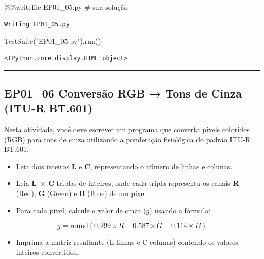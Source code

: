 \documentclass[
  portuguese,
  letterpaper,
  openany,
  oneside,
  12pt,
  a4paper]{book}
\newenvironment{Shaded}{\begin{snugshade}}{\end{snugshade}}
\newcommand{\CommentTok}[1]{\textcolor[rgb]{0.37,0.37,0.37}{#1}}
\newcommand{\NormalTok}[1]{\textcolor[rgb]{0.00,0.23,0.31}{#1}}
\newcommand{\OperatorTok}[1]{\textcolor[rgb]{0.37,0.37,0.37}{#1}}
\newcommand{\StringTok}[1]{\textcolor[rgb]{0.13,0.47,0.30}{#1}}
\providecommand{\tightlist}{%
  \setlength{\itemsep}{0pt}\setlength{\parskip}{0pt}}
\begin{document}
\begin{Shaded}
\begin{Highlighting}[]
\OperatorTok{\%\%}\NormalTok{writefile EP01\_05.py}
\CommentTok{\# sua solução}
\end{Highlighting}
\end{Shaded}

\begin{verbatim}
Writing EP01_05.py
\end{verbatim}

\begin{Shaded}
\begin{Highlighting}[]
\NormalTok{TestSuite(}\StringTok{"EP01\_05.py"}\NormalTok{).run()}
\end{Highlighting}
\end{Shaded}

\begin{verbatim}
<IPython.core.display.HTML object>
\end{verbatim}

\begin{center}\rule{0.5\linewidth}{0.5pt}\end{center}

\subsection{\texorpdfstring{EP01\_06  Conversão
RGB → Tons de Cinza (ITU-R
BT.601)}{EP01\_06  Conversão RGB → Tons de Cinza (ITU-R BT.601)}}\label{ep01_06-conversuxe3o-rgb-tons-de-cinza-itu-r-bt.601}

Nesta atividade, você deve escrever um programa que converta pixels
coloridos (RGB) para tons de cinza utilizando a ponderação fisiológica
do padrão ITU-R BT.601.

\begin{itemize}
\tightlist
\item
  Leia dois inteiros \textbf{L} e \textbf{C}, representando o número de
  linhas e colunas.
\item
  Leia \textbf{L × C} triplas de inteiros, onde cada tripla representa
  os canais \textbf{R} (Red), \textbf{G} (Green) e \textbf{B} (Blue) de
  um pixel.
\item
  Para cada pixel, calcule o valor de cinza (\(g\)) usando a fórmula:
\end{itemize}

\[g = \text{round}(0.299 \times R + 0.587 \times G + 0.114 \times B)\]

\begin{itemize}
\tightlist
\item
  Imprima a matriz resultante (L linhas e C colunas) contendo os valores
  inteiros convertidos.
\end{itemize}
\end{document}
